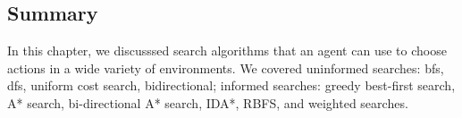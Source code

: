 \documentclass{article}
\begin{document}
\subsection{Summary}
In this chapter, we discusssed search algorithms that an agent can use to choose actions in a wide variety of environments. We covered uninformed searches: bfs, dfs, uniform cost search, bidirectional; informed searches: greedy best-first search, A* search, bi-directional A* search, IDA*, RBFS,
and weighted searches.
\end{document}
